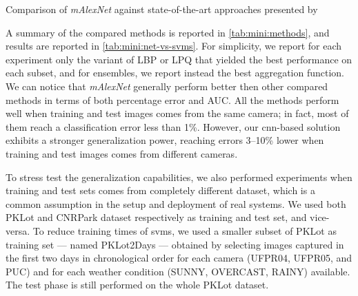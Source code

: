 \begin{table}
	\caption{Comparison of \emph{mAlexNet} against state-of-the-art approaches presented by \citet{de2015pklot}}
	\label{tab:mini:net-vs-svms}
\end{table}

A summary of the compared methods is reported in \ref{tab:mini:methods}, and results are reported in \ref{tab:mini:net-vs-svms}.
For simplicity, we report for each experiment only the variant of LBP or LPQ that yielded the best performance on each subset, and for ensembles, we report instead the best aggregation function.
We can notice that \emph{mAlexNet} generally perform better then other compared methods in terms of both percentage error and AUC.
All the methods perform well when training and test images comes from the same camera;
in fact, most of them reach a classification error less than 1\%.
However, our \gls{cnn}-based solution exhibits a stronger generalization power, reaching errors 3--10\% lower when training and test images comes from different cameras.

To stress test the generalization capabilities, we also performed experiments when training and test sets comes from completely different dataset, which is a common assumption in the setup and deployment of real systems.
We used both PKLot and CNRPark dataset respectively as training and test set, and vice-versa.
To reduce training times of \glspl{svm}, we used a smaller subset of PKLot as training set --- named PKLot2Days --- obtained by selecting images captured in the first two days in chronological order for each camera (UFPR04, UFPR05, and PUC) and for each weather condition (SUNNY, OVERCAST, RAINY) available.
The test phase is still performed on the whole PKLot dataset.

